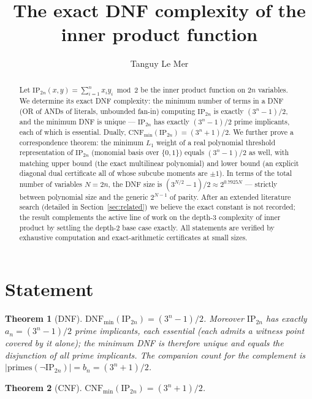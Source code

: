 \documentclass[11pt]{article}
\title{The exact DNF complexity of the inner product function}
\author{Tanguy Le Mer}
\date{}
\newtheorem{theorem}{Theorem}
\newcommand{\IP}{\mathrm{IP}}
\newcommand{\DNFmin}{\mathrm{DNF}_{\min}}
\newcommand{\CNFmin}{\mathrm{CNF}_{\min}}
\newcommand{\primes}{\mathrm{primes}}
\begin{document}
\maketitle

\begin{abstract}
Let $\IP_{2n}(x,y)=\sum_{i=1}^{n} x_i y_i \bmod 2$ be the inner
product function on $2n$ variables. We determine its exact DNF
complexity: the minimum number of terms in a DNF (OR of ANDs of
literals, unbounded fan-in) computing $\IP_{2n}$ is exactly
$(3^n-1)/2$, and the minimum DNF is unique --- $\IP_{2n}$ has exactly
$(3^n-1)/2$ prime implicants, each of which is essential. Dually,
$\CNFmin(\IP_{2n})=(3^n+1)/2$. We further prove a correspondence
theorem: the minimum $L_1$ weight of a real polynomial threshold
representation of $\IP_{2n}$ (monomial basis over $\{0,1\}$) equals
$(3^n-1)/2$ as well, with matching upper bound (the exact multilinear
polynomial) and lower bound (an explicit diagonal dual certificate all
of whose subcube moments are $\pm 1$). In terms of the total number of
variables $N=2n$, the DNF size is $(3^{N/2}-1)/2 \approx 2^{0.7925N}$
--- strictly between polynomial size and the generic $2^{N-1}$ of
parity. After an extended literature search (detailed in
Section~\ref{sec:related}) we believe the exact constant is not
recorded; the result complements the active line of work on the
depth-3 complexity of inner product by settling the depth-2 base case
exactly. All statements are verified by exhaustive computation and
exact-arithmetic certificates at small sizes.
\end{abstract}

\section{Statement}

\begin{theorem}[DNF]\label{thm:dnf}
$\DNFmin(\IP_{2n}) = (3^n-1)/2$. Moreover $\IP_{2n}$ has exactly
$a_n = (3^n-1)/2$ prime implicants, each essential (each admits a
witness point covered by it alone); the minimum DNF is therefore
unique and equals the disjunction of all prime implicants. The
companion count for the complement is
$\lvert\primes(\lnot\IP_{2n})\rvert = b_n = (3^n+1)/2$.
\end{theorem}

\begin{theorem}[CNF]\label{thm:cnf}
$\CNFmin(\IP_{2n}) = (3^n+1)/2$.
\end{theorem}
\end{document}
